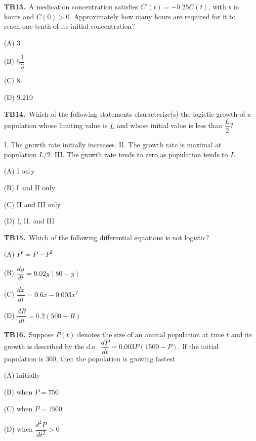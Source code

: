 \documentclass[11pt]{article}
\begin{document}
\bigskip\noindent\textbf{TB13.}\ A medication concentration satisfies $C\prime(t)=-0.25C(t)$, with $t$ in hours and $C(0)>0$. Approximately how many hours are required for it to reach one-tenth of its initial concentration?
\begin{list}{}{\setlength{\leftmargin}{3em}\setlength{\labelwidth}{2.5em}\setlength{\itemsep}{0pt}\setlength{\topsep}{2pt}}
\item[(A)] $3$
\item[(B)] $5\dfrac{1}{3}$
\item[(C)] $8$
\item[(D)] $9.210$
\end{list}

\bigskip\noindent\textbf{TB14.}\ Which of the following statements characterize(s) the logistic growth of a population whose limiting value is $L$ and whose initial value is less than $\dfrac{L}{2}$?

 I. The growth rate initially increases. II. The growth rate is maximal at population $L/2$. III. The growth rate tends to zero as population tends to $L$.
\begin{list}{}{\setlength{\leftmargin}{3em}\setlength{\labelwidth}{2.5em}\setlength{\itemsep}{0pt}\setlength{\topsep}{2pt}}
\item[(A)] I only
\item[(B)] I and II only
\item[(C)] II and III only
\item[(D)] I, II, and III
\end{list}

\bigskip\noindent\textbf{TB15.}\ Which of the following differential equations is not logistic?
\begin{list}{}{\setlength{\leftmargin}{3em}\setlength{\labelwidth}{2.5em}\setlength{\itemsep}{0pt}\setlength{\topsep}{2pt}}
\item[(A)] $P'=P-P^2$
\item[(B)] $\dfrac{dy}{dt}=0.02y(80-y)$
\item[(C)] $\dfrac{dx}{dt}=0.6x-0.003x^2$
\item[(D)] $\dfrac{dR}{dt}=0.2(500-R)$
\end{list}

\bigskip\noindent\textbf{TB16.}\ Suppose $P(t)$ denotes the size of an animal population at time $t$ and its growth is described by the d.e.\ $\dfrac{dP}{dt}=0.003P(1500-P)$. If the initial population is 300, then the population is growing fastest
\begin{list}{}{\setlength{\leftmargin}{3em}\setlength{\labelwidth}{2.5em}\setlength{\itemsep}{0pt}\setlength{\topsep}{2pt}}
\item[(A)] initially
\item[(B)] when $P=750$
\item[(C)] when $P=1500$
\item[(D)] when $\dfrac{d^2P}{dt^2}>0$
\end{list}
\end{document}
